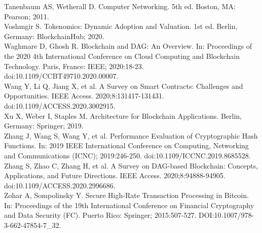\documentclass[10pt,a4paper,twocolumn]{article}
\begin{document}
Tanenbaum AS, Wetherall D. Computer Networking. 5th ed. Boston, MA: Pearson; 2011.\\

Voshmgir S. Tokenomics: Dynamic Adoption and Valuation. 1st ed. Berlin, Germany: BlockchainHub; 2020.\\

Waghmare D, Ghosh R. Blockchain and DAG: An Overview. In: Proceedings of the 2020 4th International Conference on Cloud Computing and Blockchain Technology. Paris, France: IEEE; 2020:18-23. doi:10.1109/CCBT49710.2020.00007.\\

Wang Y, Li Q, Jiang X, et al. A Survey on Smart Contracts: Challenges and Opportunities. IEEE Access. 2020;8:131417-131431. doi:10.1109/ACCESS.2020.3002915.\\

Xu X, Weber I, Staples M. Architecture for Blockchain Applications. Berlin, Germany: Springer; 2019.\\

Zhang J, Wang S, Wang Y, et al. Performance Evaluation of Cryptographic Hash Functions. In: 2019 IEEE International Conference on Computing, Networking and Communications (ICNC); 2019:246-250. doi:10.1109/ICCNC.2019.8685528.\\

Zhang S, Zhao C, Zhang H, et al. A Survey on DAG-based Blockchain: Concepts, Applications, and Future Directions. IEEE Access. 2020;8:94888-94905. doi:10.1109/ACCESS.2020.2996686.\\

Zohar A, Sompolinsky Y. Secure High-Rate Transaction Processing in Bitcoin. In: Proceedings of the 19th International Conference on Financial Cryptography and Data Security (FC). Puerto Rico: Springer; 2015:507-527. DOI:10.1007/978-3-662-47854-7\_32.\\
\end{document}
